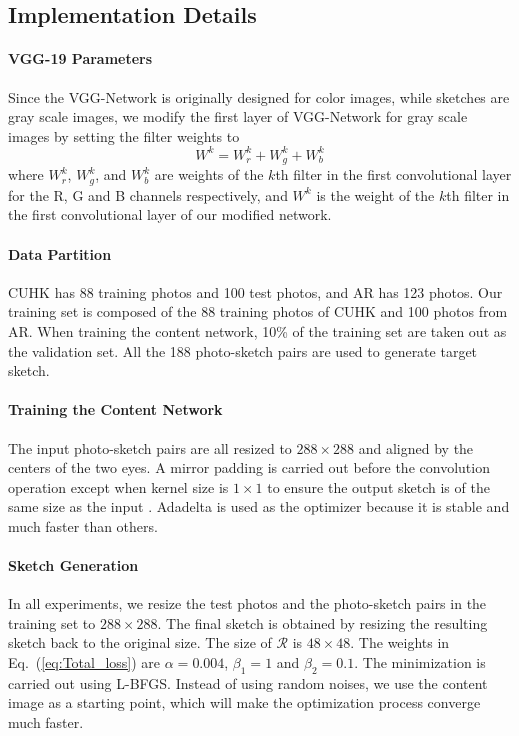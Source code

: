\documentclass[10pt,twocolumn,letterpaper]{article}
\def\blue[#1]{{#1}}
\newcommand\ken[1]{{\small \textcolor{red}{\emph{}}}}
\begin{document}
\subsection{Implementation Details}

\paragraph*{VGG-19 Parameters} Since the VGG-Network is originally designed for color images, while sketches are gray scale images, we modify the first layer of VGG-Network for gray scale images by setting the filter weights to
\begin{equation}
W^{k} = W^{k}_r+W^{k}_g+W^{k}_b
\label{eq:VGG_weights}
\end{equation}
where $W^{k}_r$, $W^{k}_g$, and $W^{k}_b$ are weights of the $k$th filter in the first convolutional layer for the R, G and B channels respectively, and $W^{k}$ is the weight of the $k$th filter in the first convolutional layer of our modified network.

\paragraph{Data Partition} CUHK \cite{wang2009face}\ken{ref?} has 88 training photos and 100 test photos, and AR \cite{martinez1998r}\ken{ref?} has 123 photos. Our training set is composed of the 88 training photos of CUHK and 100 photos from AR. When training the content network, 10\% of the training set are taken out as the validation set. All the 188 photo-sketch pairs are used to generate target sketch.

\paragraph{Training the Content Network} The input photo-sketch pairs are all resized to $288\times288$ \ken{not $288\times288$?} and aligned by the centers of the two eyes. A mirror padding is carried out before the convolution operation except when kernel size is $1\times1$ to ensure the output \blue[sketch] is of the same size as the input \ken{?}. Adadelta \cite{matt2012adadelta} is used as the optimizer because it is stable and much faster than others.  

\paragraph{Sketch Generation} 
In all experiments, we resize the test photos and the photo-sketch pairs in the training set to $288\times288$. The final sketch is obtained by resizing the resulting sketch back to the original size. The size of $\mathcal{R}$ is $48\times48$. The weights in Eq.~(\ref{eq:Total_loss}) are $\alpha=0.004$, $\beta_1=1$ and $\beta_2=0.1$. The minimization is carried out using L-BFGS. Instead of using random noises, we use the content image as a starting point, which will make the optimization process converge much faster. 
\end{document}
